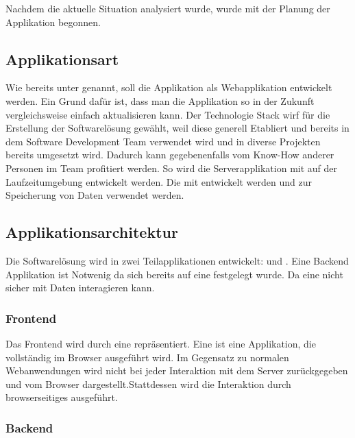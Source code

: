 Nachdem die aktuelle Situation analysiert wurde, wurde mit der Planung der Applikation begonnen.

\subsection{Applikationsart}

Wie bereits unter  genannt, soll die Applikation als Webapplikation entwickelt werden. Ein Grund dafür ist, dass man die Applikation so in der Zukunft
vergleichsweise einfach aktualisieren kann. Der Technologie Stack  wirf für die Erstellung der Softwarelösung gewählt, weil diese generell Etabliert und bereits in dem Software Development Team verwendet wird und in diverse Projekten bereits umgesetzt wird. Dadurch kann gegebenenfalls vom Know-How anderer Personen im Team profitiert werden. So wird die Serverapplikation mit  auf der Laufzeitumgebung  entwickelt werden. Die  mit  entwickelt werden und  zur Speicherung von Daten verwendet werden.

\subsection{Applikationsarchitektur}
\label{sec:Planungsphase:Applikationsarchitektur}

Die Softwarelösung wird in zwei Teilapplikationen entwickelt:  und . Eine Backend Applikation ist Notwenig da sich bereits auf eine  festgelegt wurde. Da eine  nicht sicher mit Daten interagieren kann.

\subsubsection{Frontend}
\label{sec:Planungsphase:Frontend}

Das Frontend wird durch eine  repräsentiert. Eine  ist eine Applikation, die vollständig im Browser ausgeführt wird.  Im Gegensatz zu normalen Webanwendungen wird nicht bei jeder Interaktion mit dem Server  zurückgegeben und vom Browser dargestellt.Stattdessen wird die Interaktion durch browserseitiges  ausgeführt.

\subsubsection{Backend}
\label{sec:Planungsphase:Backend}


